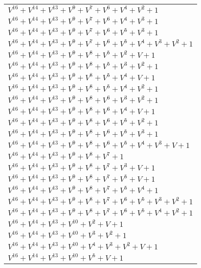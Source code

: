 \documentclass[12pt]{article}
\begin{document}
\begin{adjustwidth}{-4cm}{}
\begin{center}
\begin{longtable}{|l|}
$V^{16}  +V^{14}  +V^{13}  +V^{9}  +V^{7}  +V^{6}  +V^{4}  +V^{2}  + 1$ \\
$V^{16}  +V^{14}  +V^{13}  +V^{9}  +V^{7}  +V^{6}  +V^{4}  +V^{3}  + 1$ \\
$V^{16}  +V^{14}  +V^{13}  +V^{9}  +V^{7}  +V^{6}  +V^{5}  +V^{3}  + 1$ \\
$V^{16}  +V^{14}  +V^{13}  +V^{9}  +V^{7}  +V^{6}  +V^{5}  +V^{4}  +V^{3}  +V^{2}  + 1$ \\
$V^{16}  +V^{14}  +V^{13}  +V^{9}  +V^{8}  +V^{5}  +V^{2}  + V + 1$ \\
$V^{16}  +V^{14}  +V^{13}  +V^{9}  +V^{8}  +V^{5}  +V^{3}  +V^{2}  + 1$ \\
$V^{16}  +V^{14}  +V^{13}  +V^{9}  +V^{8}  +V^{5}  +V^{4}  + V + 1$ \\
$V^{16}  +V^{14}  +V^{13}  +V^{9}  +V^{8}  +V^{5}  +V^{4}  +V^{2}  + 1$ \\
$V^{16}  +V^{14}  +V^{13}  +V^{9}  +V^{8}  +V^{6}  +V^{3}  +V^{2}  + 1$ \\
$V^{16}  +V^{14}  +V^{13}  +V^{9}  +V^{8}  +V^{6}  +V^{4}  + V + 1$ \\
$V^{16}  +V^{14}  +V^{13}  +V^{9}  +V^{8}  +V^{6}  +V^{5}  +V^{2}  + 1$ \\
$V^{16}  +V^{14}  +V^{13}  +V^{9}  +V^{8}  +V^{6}  +V^{5}  +V^{3}  + 1$ \\
$V^{16}  +V^{14}  +V^{13}  +V^{9}  +V^{8}  +V^{6}  +V^{5}  +V^{4}  +V^{3}  + V + 1$ \\
$V^{16}  +V^{14}  +V^{13}  +V^{9}  +V^{8}  +V^{7}  + 1$ \\
$V^{16}  +V^{14}  +V^{13}  +V^{9}  +V^{8}  +V^{7}  +V^{3}  + V + 1$ \\
$V^{16}  +V^{14}  +V^{13}  +V^{9}  +V^{8}  +V^{7}  +V^{5}  + V + 1$ \\
$V^{16}  +V^{14}  +V^{13}  +V^{9}  +V^{8}  +V^{7}  +V^{5}  +V^{4}  + 1$ \\
$V^{16}  +V^{14}  +V^{13}  +V^{9}  +V^{8}  +V^{7}  +V^{6}  +V^{5}  +V^{3}  +V^{2}  + 1$ \\
$V^{16}  +V^{14}  +V^{13}  +V^{9}  +V^{8}  +V^{7}  +V^{6}  +V^{5}  +V^{4}  +V^{2}  + 1$ \\
$V^{16}  +V^{14}  +V^{13}  +V^{10}  +V^{2}  + V + 1$ \\
$V^{16}  +V^{14}  +V^{13}  +V^{10}  +V^{3}  +V^{2}  + 1$ \\
$V^{16}  +V^{14}  +V^{13}  +V^{10}  +V^{4}  +V^{3}  +V^{2}  + V + 1$ \\
$V^{16}  +V^{14}  +V^{13}  +V^{10}  +V^{5}  + V + 1$ \\

\end{longtable}
\end{center}
\end{adjustwidth}
\end{document}
